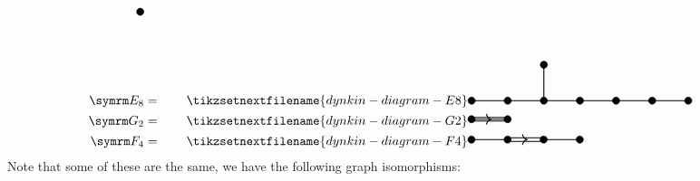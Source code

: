 \begin{align}
\begin{tikzpicture}[dynkin node/.style = {fill}, dynkin wire/.style = {thick}, baseline=-0.1cm]
        \draw [dynkin node] (2, 1) circle [radius=0.1cm];
    \end{tikzpicture}
    \\
    \E[8] &= \qquad
    \tikzsetnextfilename{dynkin-diagram-E8}
    \begin{tikzpicture}[dynkin node/.style = {fill}, dynkin wire/.style = {thick}, baseline=-0.1cm]
        \draw [dynkin wire] (0, 0) -- ++ (6, 0);
        \draw [dynkin wire] (2, 0) -- ++ (0, 1);
        \draw [dynkin node] (0, 0) circle [radius=0.1cm];
        \draw [dynkin node] (1, 0) circle [radius=0.1cm];
        \draw [dynkin node] (2, 0) circle [radius=0.1cm];
        \draw [dynkin node] (3, 0) circle [radius=0.1cm];
        \draw [dynkin node] (4, 0) circle [radius=0.1cm];
        \draw [dynkin node] (5, 0) circle [radius=0.1cm];
        \draw [dynkin node] (6, 0) circle [radius=0.1cm];
        \draw [dynkin node] (2, 1) circle [radius=0.1cm];
    \end{tikzpicture}
    \\
    \G[2] &= \qquad
    \tikzsetnextfilename{dynkin-diagram-G2}
    \begin{tikzpicture}[dynkin node/.style = {fill}, dynkin wire/.style = {thick}]
        \draw [dynkin wire] (0, 0) -- ++ (1, 0);
        \draw [dynkin wire] (0, -0.05) -- ++ (1, 0);
        \draw [dynkin wire] (0, 0.05) -- ++ (1, 0);
        \draw [dynkin node] (0, 0) circle [radius=0.1cm];
        \draw [dynkin node] (1, 0) circle [radius=0.1cm];
        \draw [-{>[width=0.3cm, length=0.15cm]}, dynkin wire] (0.55, 0) -- ++ (0.001, 0);
    \end{tikzpicture}
    \\
    \F[4] &= \qquad
    \tikzsetnextfilename{dynkin-diagram-F4}
    \begin{tikzpicture}[dynkin node/.style = {fill}, dynkin wire/.style = {thick}]
        \draw [dynkin wire] (0, 0) -- ++ (1, 0);
        \draw [dynkin wire] (1, -0.05) -- ++ (1, 0);
        \draw [dynkin wire] (1, 0.05) -- ++ (1, 0);
        \draw [dynkin wire] (2, 0) -- ++ (1, 0);
        \draw [dynkin node] (0, 0) circle [radius=0.1cm];
        \draw [dynkin node] (1, 0) circle [radius=0.1cm];
        \draw [dynkin node] (2, 0) circle [radius=0.1cm];
        \draw [dynkin node] (3, 0) circle [radius=0.1cm];
        \draw [-{>[width=0.3cm, length=0.15cm]}, dynkin wire] (1.55, 0) -- ++ (0.001, 0);
    \end{tikzpicture}
\end{align}
\endgroup
Note that some of these are the same, we have the following graph isomorphisms:
